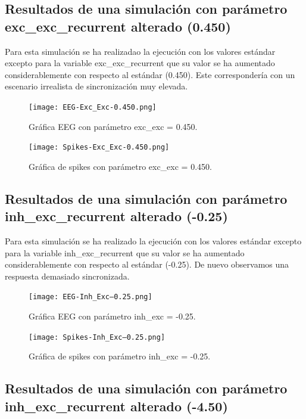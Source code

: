 \documentclass[oneside,openright,titlepage,numbers=noenddot,openany,headinclude,footinclude=true,
cleardoublepage=empty,abstractoff,BCOR=5mm,paper=a4,fontsize=12pt,main=spanish]{scrreprt}
\begin{document}
\newpage
\subsection{Resultados de una simulación con parámetro exc\_exc\_recurrent alterado (0.450)}

Para esta simulación se ha realizadao la ejecución con los valores estándar excepto para la variable exc\_exc\_recurrent que su valor se ha aumentado considerablemente con respecto al estándar (0.450). Este correspondería con un escenario irrealista de sincronización muy elevada.

\begin{figure}[htb]
	\centering
	\texttt{[image: EEG-Exc\_Exc-0.450.png]}
	\caption{Gráfica EEG con parámetro exc\_exc = 0.450.}
\end{figure}

\begin{figure}[htb]
	\centering
	\texttt{[image: Spikes-Exc\_Exc-0.450.png]}
	\caption{Gráfica de spikes con parámetro exc\_exc = 0.450.}
\end{figure}

\newpage
\subsection{Resultados de una simulación con parámetro inh\_exc\_recurrent alterado (-0.25)}

Para esta simulación se ha realizado la ejecución con los valores estándar excepto para la variable inh\_exc\_recurrent que su valor se ha aumentado considerablemente con respecto al estándar (-0.25). De nuevo observamos una respuesta demasiado sincronizada.

\begin{figure}[htb]
	\centering
	\texttt{[image: EEG-Inh\_Exc--0.25.png]}
	\caption{Gráfica EEG con parámetro inh\_exc = -0.25.}
\end{figure}

\begin{figure}[htb]
	\centering
	\texttt{[image: Spikes-Inh\_Exc--0.25.png]}
	\caption{Gráfica de spikes con parámetro inh\_exc = -0.25.}
\end{figure}

\newpage
\subsection{Resultados de una simulación con parámetro inh\_exc\_recurrent alterado (-4.50)}
\end{document}
